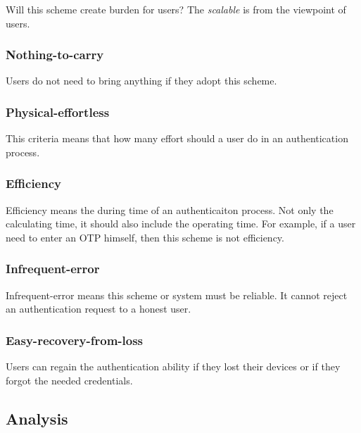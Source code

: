 \begin{CJK}{Bg5}{bsmi}
Will this scheme create burden for users? The \emph{scalable} is from the viewpoint of users.

\subsubsection{Nothing-to-carry}

Users do not need to bring anything if they adopt this scheme.

\subsubsection{Physical-effortless}

This criteria means that how many effort should a user do in an authentication process.

\subsubsection{Efficiency}

Efficiency means the during time of an authenticaiton process. Not only the calculating time, it should also include the operating time. For example, if a user need to enter an OTP himself, then this scheme is not efficiency.

\subsubsection{Infrequent-error}

Infrequent-error means this scheme or system must be reliable. It cannot reject an authentication request to a honest user.

\subsubsection{Easy-recovery-from-loss}

Users can regain the authentication ability if they lost their devices or if they forgot the needed credentials.

\subsection{Analysis}

\begin{comment}
The usability can not be neglected when researchers trying to design a system.
Usability is a subjective perception, it may be different from person to person.
The following paragragh states the criterias I used to estimate the usability of a system.
\end{comment}


\end{CJK}
